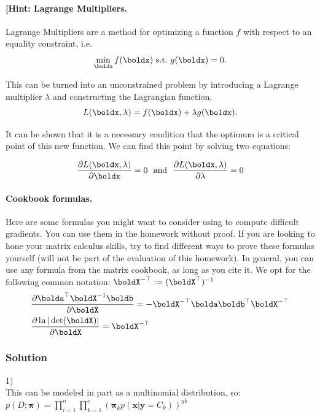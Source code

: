 \documentclass[submit]{harvardml}
\begin{document}
\begin{problem}
\paragraph{[Hint: Lagrange Multipliers.} Lagrange Multipliers are a method for
optimizing a function $f$ with respect to an
equality constraint, i.e. 
\[\min_{\boldx} f(\boldx)\ \text{s.t.}\ g(\boldx) = 0.\]

This can be turned into an unconstrained problem by introducing a
Lagrange multiplier $\lambda$ and constructing the Lagrangian function,
\[L(\boldx, \lambda) =  f(\boldx) + \lambda g(\boldx).\]

It can be shown that it is a necessary condition that the optimum 
is a critical point of this new function. We can find this point by solving two equations:

\[\frac{\partial L(\boldx, \lambda)}{\partial  \boldx} = 0  \ \ \text{and}\  \  \frac{\partial L(\boldx, \lambda)}{\partial \lambda} = 0 \]


\paragraph{Cookbook formulas.} Here are some formulas you might want to consider
using to compute difficult gradients. You can use them  in the homework
without proof. If you are looking to hone your matrix calculus skills, try to
find different ways to prove these formulas yourself (will not be part of the
evaluation of this homework). In general, you can use any formula from the matrix cookbook,
as long as you cite it. We opt for the following common notation:
$\boldX^{-\top} := (\boldX^{\top})^{-1}$
\begin{align*}
  & \frac{\partial \bolda^\top \boldX^{-1} \boldb}{\partial \boldX} = - \boldX^{-\top} \bolda \boldb^\top \boldX^{-\top} \\
  & \frac{\partial \ln | \det (\boldX) |}{\partial \boldX} = \boldX^{-\top}
 \end{align*}
 \end{problem}



\subsubsection*{Solution}
1)\\
This can be modeled in part as a multinomial distribution, so:
$p(D; \boldsymbol{\pi})= \prod_{i=1}^{n}\prod_{k=1}^{c}(\boldsymbol{\pi}_k p(\textbf{x}|\textbf{y}=C_k))^{yk}$
\end{document}
